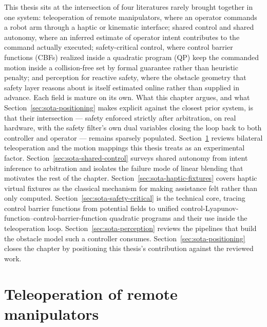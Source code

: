 \documentclass[12pt,a4paper,twoside,openright]{report}
\begin{document}
This thesis sits at the intersection of four literatures rarely brought together in one system: teleoperation of remote manipulators, where an operator commands a robot arm through a haptic or kinematic interface; shared control and shared autonomy, where an inferred estimate of operator intent contributes to the command actually executed; safety-critical control, where control barrier functions (CBFs) realized inside a quadratic program (QP) keep the commanded motion inside a collision-free set by formal guarantee rather than heuristic penalty; and perception for reactive safety, where the obstacle geometry that safety layer reasons about is itself estimated online rather than supplied in advance. Each field is mature on its own. What this chapter argues, and what Section~\ref{sec:sota-positioning} makes explicit against the closest prior system, is that their intersection --- safety enforced strictly after arbitration, on real hardware, with the safety filter's own dual variables closing the loop back to both controller and operator --- remains sparsely populated. Section~\ref{sec:sota-teleoperation} reviews bilateral teleoperation and the motion mappings this thesis treats as an experimental factor. Section~\ref{sec:sota-shared-control} surveys shared autonomy from intent inference to arbitration and isolates the failure mode of linear blending that motivates the rest of the chapter. Section~\ref{sec:sota-haptic-fixtures} covers haptic virtual fixtures as the classical mechanism for making assistance felt rather than only computed. Section~\ref{sec:sota-safety-critical} is the technical core, tracing control barrier functions from potential fields to unified control-Lyapunov-function--control-barrier-function quadratic programs and their use inside the teleoperation loop. Section~\ref{sec:sota-perception} reviews the pipelines that build the obstacle model such a controller consumes. Section~\ref{sec:sota-positioning} closes the chapter by positioning this thesis's contribution against the reviewed work.

\section{Teleoperation of remote manipulators}
\label{sec:sota-teleoperation}
\end{document}
